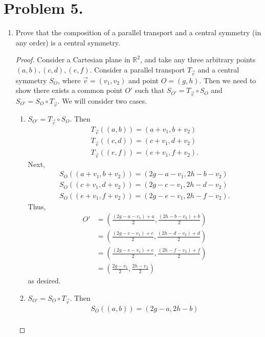 \documentclass{article}
\begin{document}
\section{Problem 5.}
\begin{enumerate}[label=(\alph*)]
    \item Prove that the composition of a parallel transport and a central symmetry (in any order) is a central symmetry. \label{5a}
    \begin{proof}
    Consider a Cartesian plane in $\mathbb{R}^2$, and take any three arbitrary points $(a,b), (c,d), (e,f)$. Consider a parallel transport $T_{\overrightarrow{v}}$ and a central symmetry $S_O$, where $\overrightarrow{v}=(v_1,v_2)$ and point $O=(g,h)$. Then we need to show there exists a common point $O'$ such that $S_{O'}=T_{\overrightarrow{v}}\circ S_O$ and $S_{O'}=S_O\circ T_{\overrightarrow{v}}$. We will consider two cases.
    \begin{enumerate}[label=(\arabic*)]
        \item $S_{O'}=T_{\overrightarrow{v}}\circ S_O$. Then \begin{align*}
            T_{\overrightarrow{v}}((a,b))=(a+v_1,b+v_2)\\ T_{\overrightarrow{v}}((c,d))=(c+v_1,d+v_2)\\
            T_{\overrightarrow{v}}((e,f))=(e+v_1,f+v_2).
        \end{align*}
        Next, 
        \begin{align*}
            S_O((a+v_1,b+v_2))=(2g-a-v_1,2h-b-v_2)\\
            S_O((c+v_1,d+v_2))=(2g-c-v_1,2h-d-v_2)\\
            S_O((e+v_1,f+v_2))=(2g-e-v_1,2h-f-v_2).
        \end{align*}
        Thus,
        \begin{align*}
            O'&=\left(\frac{(2g-a-v_1)+a}{2},\frac{(2h-b-v_2)+b}{2}\right )\\
            &=\left (\frac{(2g-c-v_1)+c}{2},\frac{(2h-d-v_2)+d}{2}\right )\\
            &=\left (\frac{(2g-e-v_1)+e}{2},\frac{(2h-f-v_2)+f}{2}\right )\\
            &=\left (\frac{2g-v_1}{2},\frac{2h-v_2}{2}\right )
        \end{align*} as desired.
        \item $S_{O'}=S_O\circ T_{\overrightarrow{v}}$. Then
        \begin{align*}
            S_O((a,b))=(2g-a,2h-b)\\

\end{align*}
\end{enumerate}
\end{proof}
\end{enumerate}
\end{document}
